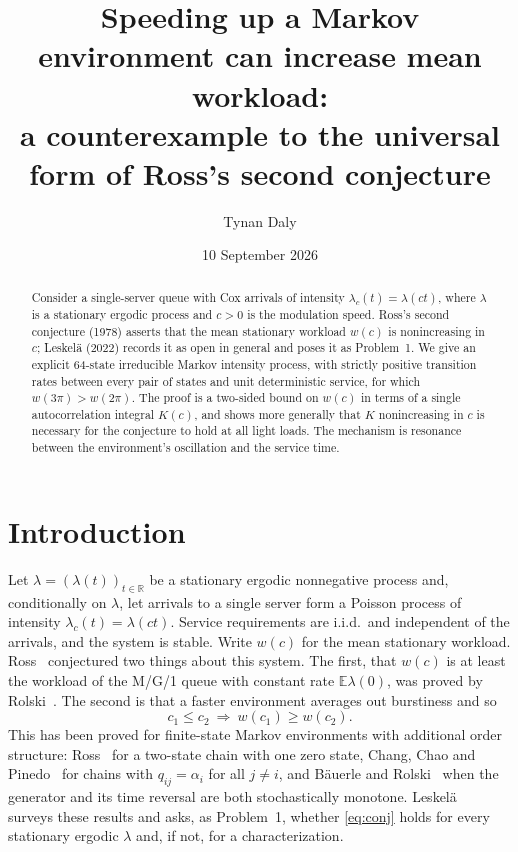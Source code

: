 \documentclass[11pt]{article}
\title{Speeding up a Markov environment can increase mean workload:\\
a counterexample to the universal form of Ross's second conjecture}
\author{Tynan Daly}
\date{10 September 2026}
\newcommand{\E}{\mathbb{E}}
\theoremstyle{remark}
\begin{document}
\maketitle

\begin{abstract}
Consider a single-server queue with Cox arrivals of intensity $\lambda_c(t)=\lambda(ct)$, where $\lambda$ is a stationary ergodic process and $c>0$ is the modulation speed. Ross's second conjecture (1978) asserts that the mean stationary workload $w(c)$ is nonincreasing in $c$; Leskel\"a (2022) records it as open in general and poses it as Problem~1. We give an explicit 64-state irreducible Markov intensity process, with strictly positive transition rates between every pair of states and unit deterministic service, for which $w(3\pi)>w(2\pi)$. The proof is a two-sided bound on $w(c)$ in terms of a single autocorrelation integral $K(c)$, and shows more generally that $K$ nonincreasing in $c$ is necessary for the conjecture to hold at all light loads. The mechanism is resonance between the environment's oscillation and the service time.
\end{abstract}

\section{Introduction}

Let $\lambda=(\lambda(t))_{t\in\mathbb R}$ be a stationary ergodic nonnegative process and, conditionally on $\lambda$, let arrivals to a single server form a Poisson process of intensity $\lambda_c(t)=\lambda(ct)$. Service requirements are i.i.d.\ and independent of the arrivals, and the system is stable. Write $w(c)$ for the mean stationary workload. Ross~\cite{ross} conjectured two things about this system. The first, that $w(c)$ is at least the workload of the M/G/1 queue with constant rate $\E\lambda(0)$, was proved by Rolski~\cite{rolski81}. The second is that a faster environment averages out burstiness and so
\begin{equation}
c_1\le c_2\ \Longrightarrow\ w(c_1)\ge w(c_2).
\label{eq:conj}
\end{equation}
This has been proved for finite-state Markov environments with additional order structure: Ross~\cite{ross} for a two-state chain with one zero state, Chang, Chao and Pinedo~\cite{ccp} for chains with $q_{ij}=\alpha_i$ for all $j\ne i$, and B\"auerle and Rolski~\cite{br} when the generator and its time reversal are both stochastically monotone. Leskel\"a~\cite{leskela} surveys these results and asks, as Problem~1, whether \eqref{eq:conj} holds for every stationary ergodic $\lambda$ and, if not, for a characterization.
\end{document}
